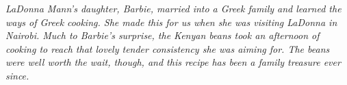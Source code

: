 \begin{minipage}{\linewidth}
\end{minipage}\par\begin{minipage}{\linewidth} 
\textit{LaDonna Mann's daughter, Barbie, married into a Greek family and learned the ways of Greek cooking.  She made this for us when she was visiting LaDonna in Nairobi. Much to Barbie's surprise, the Kenyan beans took an afternoon of cooking to reach that lovely tender consistency she was aiming for.  The beans were well worth the wait, though, and this recipe has been a family treasure ever since.} \\


\end{minipage}
